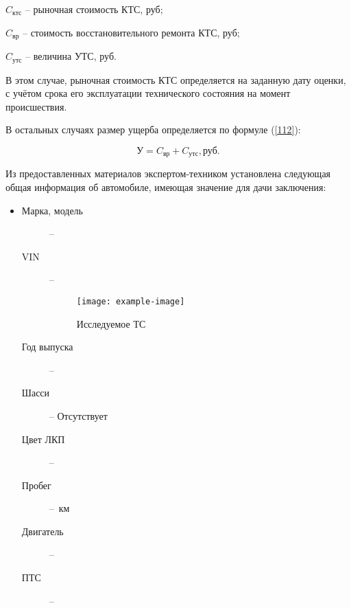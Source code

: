 $  C_\text{ктс} $ --  рыночная стоимость КТС, руб;

$ C_\text{вр}  $ -- стоимость восстановительного ремонта КТС, руб;

$ C_\text{утс} $ --  величина УТС, руб.

В этом случае, рыночная стоимость КТС определяется на заданную дату оценки, с учётом срока его эксплуатации технического состояния на момент происшествия.

В остальных случаях размер ущерба определяется по формуле (\ref{112}):

\begin{equation}\label{112}
	\text{У} = C_\text{вр} + C_\text{утс},    \text{руб.}
\end{equation}


 \par Из предоставленных материалов   экспертом-техником установлена следующая общая информация об автомобиле, имеющая значение для дачи заключения:\\
 \parbox[]{10cm}{}
	\begin{itemize}
		\item[ ] 
			\begin{description}
			\item[Марка, модель] -- 
			\item[VIN] -- \vin
			\vspace{6mm}
			\begin{figure}[H]
				\centering
				\texttt{[image: example-image]}
				\caption{{\footnotesize {Исследуемое ТС }}}
				\label{ris:images/1}
			\end{figure}
			
			\item[Год выпуска] -- 
			\item[Шасси] -- Отсутствует
			\item[Цвет ЛКП] -- 
			\item[Пробег] --  \,км%
			\item[Двигатель] -- 
	    	\item[ПТС] --	
		\end{description}
		\end{itemize}
